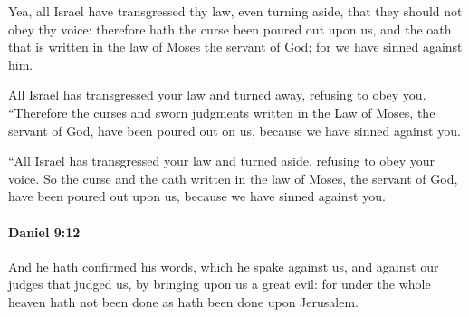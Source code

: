 			\begin{versebox}
					\item[BHS] 
					\item[LXX] 
					\item[ASV] Yea, all Israel have transgressed thy law, even turning aside, that they should not obey thy voice: therefore hath the curse been poured out upon us, and the oath that is written in the law of Moses the servant of God; for we have sinned against him.
					\item[NIV] All Israel has transgressed your law and turned away, refusing to obey you. “Therefore the curses and sworn judgments written in the Law of Moses, the servant of God, have been poured out on us, because we have sinned against you.
					\item[NRSV] “All Israel has transgressed your law and turned aside, refusing to obey your voice. So the curse and the oath written in the law of Moses, the servant of God, have been poured out upon us, because we have sinned against you.
			\end{versebox}

		\paragraph{Daniel 9:12} %
			\label{DANIEL-9-12}

			And he hath confirmed his words, which he spake against us, and against our judges that judged us, by bringing upon us a great evil: for under the whole heaven hath not been done as hath been done upon Jerusalem.

